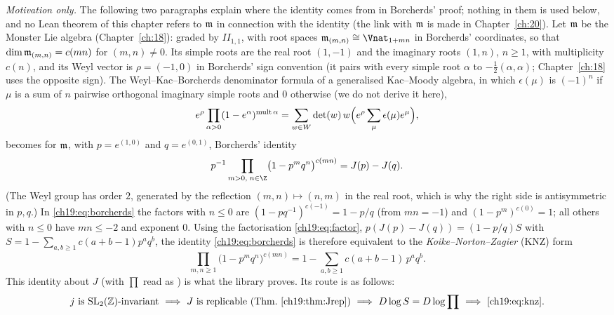 \emph{Motivation only.}  The following two paragraphs explain where the identity comes from in Borcherds' proof; nothing in
them is used below, and no Lean theorem of this chapter refers to $\mathfrak{m}$ in connection with the identity (the link with
$\mathfrak{m}$ is made in Chapter~\ref{ch:20}).  Let $\mathfrak{m}$ be the Monster Lie algebra (Chapter~\ref{ch:18}): graded by $I\!I_{1,1}$, with root spaces
$\chnineteenm_{(m,n)}\cong\Vnat_{1+mn}$ in Borcherds' coordinates, so that $\dim\mathfrak{m}_{(m,n)}=c(mn)$ for $(m,n)\ne0$.  Its
simple roots are the real root $(1,-1)$ and the imaginary roots $(1,n)$, $n\ge1$, with multiplicity $c(n)$, and its Weyl
vector is $\rho=(-1,0)$ in Borcherds' sign convention (it pairs with every simple root $\alpha$ to $-\frac12(\alpha,\alpha)$; Chapter~\ref{ch:18}
uses the opposite sign).  The Weyl--Kac--Borcherds denominator formula of a generalised Kac--Moody algebra, in which $\epsilon(\mu)$ is
$(-1)^n$ if $\mu$ is a sum of $n$ pairwise orthogonal imaginary simple roots and $0$ otherwise (we do not derive it here),
\begin{equation*}
  e^{\rho}\prod_{\alpha>0}(1-e^{\alpha})^{\operatorname{mult}\alpha}=\sum_{w\in W}\det(w)\,w\Bigl(e^\rho\sum_{\mu}\epsilon(\mu)e^{\mu}\Bigr),
\end{equation*}
becomes for $\mathfrak{m}$, with $p=e^{(1,0)}$ and $q=e^{(0,1)}$, Borcherds' identity
\begin{equation}\label{ch19:eq:borcherds}
  p^{-1}\prod_{m>0,\;n\in\Z}\bigl(1-p^mq^n\bigr)^{c(mn)}=J(p)-J(q) .
\end{equation}
(The Weyl group has order $2$, generated by the reflection $(m,n)\mapsto(n,m)$ in the real root, which is why the right
side is antisymmetric in $p,q$.)  In \eqref{ch19:eq:borcherds} the factors with $n\le0$ are $(1-pq^{-1})^{c(-1)}=1-p/q$
(from $mn=-1$) and $(1-p^m)^{c(0)}=1$; all others with $n\le0$ have $mn\le-2$ and exponent $0$.  Using the factorisation
\eqref{ch19:eq:factor}, $p(J(p)-J(q))=(1-p/q)S$ with $S=1-\sum_{a,b\ge1}c(a+b-1)p^aq^b$, the identity
\eqref{ch19:eq:borcherds} is therefore equivalent to the \emph{Koike--Norton--Zagier} (KNZ) form
\begin{equation}\label{ch19:eq:knz}
  \prod_{m,n\ge1}\bigl(1-p^mq^n\bigr)^{c(mn)}=1-\sum_{a,b\ge1}c(a+b-1)\,p^aq^b .\tag{KNZ}
\end{equation}
This identity about $J$ (with $\prod$ read as ) is what the library proves.  Its route is as follows:
\begin{equation*}
  \text{$j$ is $\chnineteenSL$-invariant}\ \Longrightarrow\ \text{$J$ is replicable (Thm.~\ref{ch19:thm:Jrep})}
  \ \Longrightarrow\ D\log S=D\log\prod\ \Longrightarrow\ \eqref{ch19:eq:knz}.
\end{equation*}


